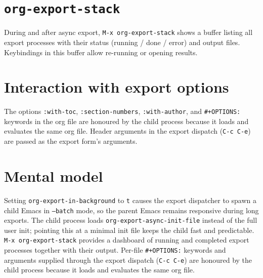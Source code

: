 \section{\texttt{org-export-stack}}\label{org-export-stack}

During and after async export, \texttt{M-x org-export-stack} shows a buffer listing all export processes with their status (running / done / error) and output files. Keybindings in this buffer allow re-running or opening results.

\section{Interaction with export options}\label{interaction-with-export-options}

The options \texttt{:with-toc}, \texttt{:section-numbers}, \texttt{:with-author}, and \texttt{\#+OPTIONS:} keywords in the org file are honoured by the child process because it loads and evaluates the same org file. Header arguments in the export dispatch (\texttt{C-c C-e}) are passed as the export form's arguments.

\section{Mental model}
Setting \texttt{org-export-in-background} to \texttt{t} causes the export
dispatcher to spawn a child Emacs in \texttt{--batch} mode, so the parent
Emacs remains responsive during long exports.  The child process loads
\texttt{org-export-async-init-file} instead of the full user init; pointing
this at a minimal init file keeps the child fast and predictable.
\texttt{M-x org-export-stack} provides a dashboard of running and completed
export processes together with their output.  Per-file \texttt{\#+OPTIONS:}
keywords and arguments supplied through the export dispatch (\texttt{C-c C-e})
are honoured by the child process because it loads and evaluates the same org
file.
